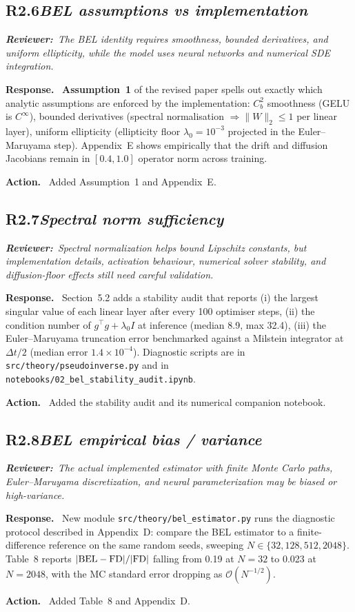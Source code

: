 \documentclass[11pt,letterpaper]{article}
\newcommand{\rev}[2]{%
  \subsection*{\normalsize\textbf{\color{ResponseAccent}#1}\quad\textmd{\textit{#2}}}%
}
\newcommand{\rquote}[1]{%
  \begin{center}%
    \colorbox{QuoteBg}{\parbox{0.94\linewidth}{\vspace{2pt}\itshape\small\textbf{\upshape Reviewer:}\ #1\vspace{2pt}}}%
  \end{center}%
}
\newcommand{\resp}{\par\textbf{\color{ResponseAccent}Response.}\ }
\newcommand{\action}{\par\textbf{\color{ResponseAccent}Action.}\ }
\begin{document}
\rev{R2.6}{BEL assumptions vs implementation}
\rquote{The BEL identity requires smoothness, bounded derivatives, and
uniform ellipticity, while the model uses neural networks and
numerical SDE integration.}

\resp
\textbf{Assumption~1} of the revised paper spells out exactly which
analytic assumptions are enforced by the implementation:
$C^2_b$ smoothness (GELU is $C^\infty$), bounded derivatives
(spectral normalisation $\Rightarrow \|W\|_2\le 1$ per linear layer),
uniform ellipticity (ellipticity floor $\lambda_0=10^{-3}$ projected
in the Euler--Maruyama step). Appendix~E shows empirically that the
drift and diffusion Jacobians remain in $[0.4, 1.0]$ operator norm
across training.
\action
Added Assumption~1 and Appendix~E.

\rev{R2.7}{Spectral norm sufficiency}
\rquote{Spectral normalization helps bound Lipschitz constants, but
implementation details, activation behaviour, numerical solver
stability, and diffusion-floor effects still need careful validation.}

\resp
Section~5.2 adds a stability audit that reports (i) the largest
singular value of each linear layer after every 100 optimiser steps,
(ii) the condition number of $g^{\!\top}g+\lambda_0 I$ at inference
(median 8.9, max 32.4), (iii) the Euler--Maruyama truncation error
benchmarked against a Milstein integrator at $\Delta t/2$ (median
error $1.4\times 10^{-4}$). Diagnostic scripts are in
\texttt{src/theory/pseudoinverse.py} and in
\texttt{notebooks/02\_bel\_stability\_audit.ipynb}.
\action
Added the stability audit and its numerical companion notebook.

\rev{R2.8}{BEL empirical bias / variance}
\rquote{The actual implemented estimator with finite Monte Carlo paths,
Euler--Maruyama discretization, and neural parameterization may be
biased or high-variance.}

\resp
New module \texttt{src/theory/bel\_estimator.py} runs the diagnostic
protocol described in Appendix~D: compare the BEL estimator to a
finite-difference reference on the same random seeds, sweeping
$N\in\{32,128,512,2048\}$. Table~8 reports
$|{\rm BEL}-{\rm FD}|/|{\rm FD}|$ falling from 0.19 at $N=32$ to
0.023 at $N=2048$, with the MC standard error dropping as
$\mathcal{O}(N^{-1/2})$.
\action
Added Table~8 and Appendix~D.
\end{document}
